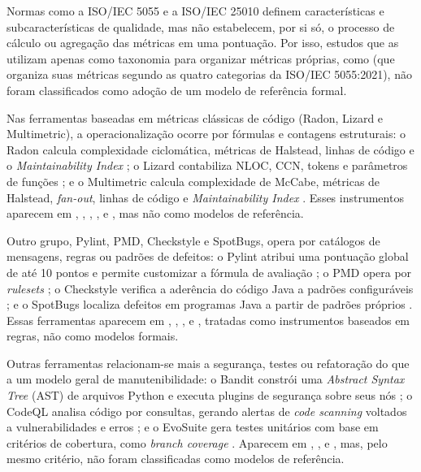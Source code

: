 Normas como a ISO/IEC 5055 e a ISO/IEC 25010 definem características e subcaracterísticas de qualidade, mas não estabelecem, por si só, o processo de cálculo ou agregação das métricas em uma pontuação. Por isso, estudos que as utilizam apenas como taxonomia para organizar métricas próprias, como  (que organiza suas métricas segundo as quatro categorias da ISO/IEC 5055:2021), não foram classificados como adoção de um modelo de referência formal.

Nas ferramentas baseadas em métricas clássicas de código (Radon, Lizard e Multimetric), a operacionalização ocorre por fórmulas e contagens estruturais: o Radon calcula complexidade ciclomática, métricas de Halstead, linhas de código e o \textit{Maintainability Index} \cite{radon2026}; o Lizard contabiliza NLOC, CCN, tokens e parâmetros de funções \cite{lizard2026}; e o Multimetric calcula complexidade de McCabe, métricas de Halstead, \textit{fan-out}, linhas de código e \textit{Maintainability Index} \cite{multimetric2026}. Esses instrumentos aparecem em , , , ,  e , mas não como modelos de referência.

Outro grupo, Pylint, PMD, Checkstyle e SpotBugs, opera por catálogos de mensagens, regras ou padrões de defeitos: o Pylint atribui uma pontuação global de até 10 pontos e permite customizar a fórmula de avaliação \cite{pylint2026}; o PMD opera por \textit{rulesets} \cite{pmd2026}; o Checkstyle verifica a aderência do código Java a padrões configuráveis \cite{checkstyle2026}; e o SpotBugs localiza defeitos em programas Java a partir de padrões próprios . Essas ferramentas aparecem em , , ,  e , tratadas como instrumentos baseados em regras, não como modelos formais.

Outras ferramentas relacionam-se mais a segurança, testes ou refatoração do que a um modelo geral de manutenibilidade: o Bandit constrói uma \textit{Abstract Syntax Tree} (AST) de arquivos Python e executa plugins de segurança sobre seus nós \cite{bandit2026}; o CodeQL analisa código por consultas, gerando alertas de \textit{code scanning} voltados a vulnerabilidades e erros \cite{github2026}; e o EvoSuite gera testes unitários com base em critérios de cobertura, como \textit{branch coverage} \cite{evosuite2026}. Aparecem em , ,  e , mas, pelo mesmo critério, não foram classificadas como modelos de referência.

